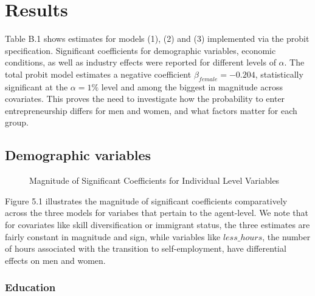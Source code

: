 \chapter{Results\label{ch:results}}

Table B.1 shows estimates for models (1), (2) and (3) implemented via the probit specification. Significant coefficients for demographic variables, economic conditions, as well as industry effects were reported for different levels of $\alpha$. The total probit model estimates a negative coefficient $\beta_{female} = -0.204$, statistically significant at the $\alpha = 1\%$ level and among the biggest in magnitude across covariates. This proves the need to investigate how the probability to enter entrepreneurship differs for men and women, and what factors matter for each group.

\section{Demographic variables}

\begin{figure}[hbtp]
    \caption{Magnitude of Significant Coefficients for Individual Level Variables} 
\end{figure}

Figure 5.1 illustrates the magnitude of significant coefficients comparatively across the three models for variabes that pertain to the agent-level. We note that for covariates like skill diversification or immigrant status, the three estimates are fairly constant in magnitude and sign, while variables like $less\_hours$, the number of hours associated with the transition to self-employment, have differential effects on men and women. 

\subsection{Education}

